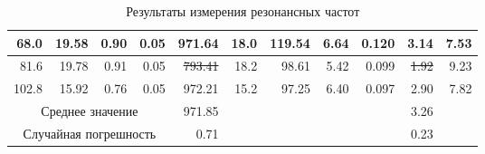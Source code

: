 \documentclass[12pt, a4paper]{article}
\begin{document}
\begin{table}[H]
\begin{tabular}{|rrrr|r|rrrr|r|r|}
    \multicolumn{1}{|r|}{68.0}             & \multicolumn{1}{r|}{19.58}                & \multicolumn{1}{r|}{0.90}            & 0.05                                  & 971.64                                   & \multicolumn{1}{r|}{18.0} & \multicolumn{1}{r|}{119.54}                  & \multicolumn{1}{r|}{6.64}                        & 0.120                                               & 3.14                                        & 7.53                                    \\ \hline
    \multicolumn{1}{|r|}{81.6}             & \multicolumn{1}{r|}{19.78}                & \multicolumn{1}{r|}{0.91}            & 0.05                                  & \st{793.41}                                   & \multicolumn{1}{r|}{18.2} & \multicolumn{1}{r|}{98.61}                   & \multicolumn{1}{r|}{5.42}                        & 0.099                                                & \st{1.92}                                        & 9.23                                    \\ \hline
    \multicolumn{1}{|r|}{102.8}            & \multicolumn{1}{r|}{15.92}                & \multicolumn{1}{r|}{0.76}            & 0.05                                  & 972.21                                   & \multicolumn{1}{r|}{15.2} & \multicolumn{1}{r|}{97.25}                   & \multicolumn{1}{r|}{6.40}                        & 0.097                                                & 2.90                                        & 7.82                                    \\ \hline
    \multicolumn{4}{|c|}{Среднее значение}                                                                                                                            & 971.85                                   & \multicolumn{4}{r|}{}                                                                                                                                                             & 3.26                                        &                                     \\ \hline
    \multicolumn{4}{|c|}{Случайная погрешность}                                                                                                                       & 0.71                                     & \multicolumn{4}{r|}{}                                                                                                                                                             & 0.23                                        &                                     \\ \hline
  \end{tabular}
  \caption{Результаты измерения резонансных частот}
  \label{dataall}
\end{table}
\end{document}
